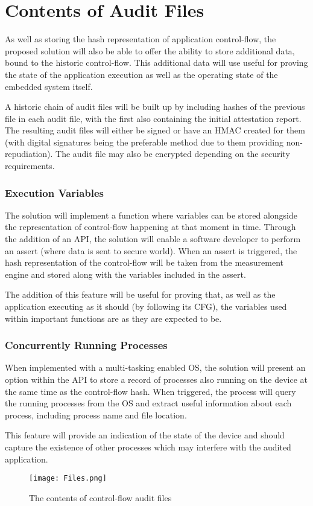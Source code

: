 \section{Contents of Audit Files}

As well as storing the hash representation of application control-flow, the proposed solution will also be able to offer the ability to store additional data, bound to the historic control-flow. This additional data will use useful for proving the state of the application execution as well as the operating state of the embedded system itself.

A historic chain of audit files will be built up by including hashes of the previous file in each audit file, with the first also containing the initial attestation report. The resulting audit files will either be signed or have an HMAC created for them (with digital signatures being the preferable method due to them providing non-repudiation). The audit file may also be encrypted depending on the security requirements. 

\subsubsection*{Execution Variables}

The solution will implement a function where variables can be stored alongside the representation of control-flow happening at that moment in time. Through the addition of an API, the solution will enable a software developer to perform an assert (where data is sent to secure world). When an assert is triggered, the hash representation of the control-flow will be taken from the measurement engine and stored along with the variables included in the assert.

The addition of this feature will be useful for proving that, as well as the application executing as it should (by following its CFG), the variables used within important functions are as they are expected to be.

\subsubsection*{Concurrently Running Processes}

When implemented with a multi-tasking enabled OS, the solution will present an option within the API to store a record of processes also running on the device  at the same time as the control-flow hash. When triggered, the process will query the running processes from the OS and extract useful information about each process, including process name and file location.

This feature will provide an indication of the state of the device and should capture the existence of other processes which may interfere with the audited application. 

\begin{figure}
  \centering
  \vspace*{0.5in}
  \texttt{[image: Files.png]}
  \caption{The contents of control-flow audit files}
  \label{fig:auditFiles}
\end{figure}
